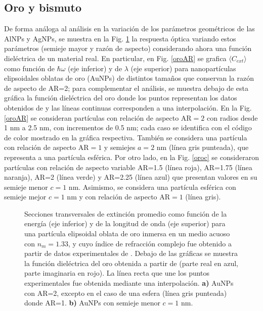 \subsection*{Oro y bismuto}
De forma análoga al análisis en la variación de los parámetros geométricos de las AlNPs y AgNPs, se muestra en la Fig. \ref{oro} la respuesta óptica variando estos parámetros (semieje mayor y razón de aspecto) considerando ahora una función dieléctrica de un material real. En particular, en Fig. \ref{oroAR} se grafica $\langle C_{ext}\rangle$ como función de $\hbar\omega$ (eje inferior) y de $\lambda$ (eje superior) para nanopartículas elipsoidales oblatas de oro (AuNPs) de distintos tamaños que conservan la razón de aspecto de AR=2; para complementar el análisis, se muestra debajo de esta gráfica la función dieléctrica del oro donde los puntos representan los datos obtenidos de \cite{Plata} y las líneas continuas corresponden a una interpolación. En la Fig. \ref{oroAR} se consideran partículas con relación de aspecto AR$=2$ con radios desde 1  nm a 2.5 nm, con incrementos de 0.5 nm; cada caso se identifica con el código de color mostrado en la gráfica respectiva. También se considera una partícula con relación de aspecto AR$=1$ y semiejes $a=2$ nm (línea gris punteada), que representa a una partícula esférica. Por otro lado, en la Fig. \ref{oroc} se consideraron partículas con relación de aspecto variable AR=1.5 (línea roja), AR=1.75 (línea naranja), AR=2 (línea verde) y AR=2.25 (línea azul) que presentan valores en su semieje menor $c=1\text{ nm}$. Asimismo, se considera una partícula esférica con semieje mejor $c=1\text{ nm}$ y con relación de aspecto AR$=1$ (línea gris).
\begin{figure}[H]
	\quad%
	\caption{Secciones transversales de extinción promedio como función de la energía (eje inferior) y de la longitud de onda (eje superior) para una partícula elipsoidal oblata de oro inmersa en un medio acuoso con $n_m=1.33$, y cuyo índice de refracción complejo fue obtenido a partir de datos experimentales de \cite{Plata}. Debajo de las gráficas se muestra la función dieléctrica del oro obtenida a partir de \cite{Plata} (parte real en azul, parte imaginaria en rojo). La línea recta que une los puntos experimentales fue obtenida mediante una interpolación. \textbf{a)} AuNPs con AR=2, excepto en el caso de una esfera (línea gris punteada) donde AR=1. \textbf{b)} AuNPs con semieje menor $c=1$ nm.}\label{oro}
\end{figure}

